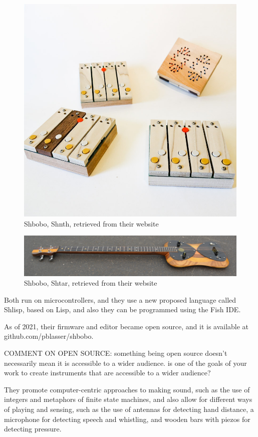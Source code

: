\begin{figure}[h]
  \centering
  \includegraphics[width=0.75\linewidth,height=0.25\textheight,keepaspectratio]{images/shbobo-shnth.jpg}
  \caption{Shbobo, Shnth, retrieved from their website}
  \label{fig:shbobo-shnth}
\end{figure}

\begin{figure}[h]
  \centering
    \includegraphics[width=0.75\linewidth,height=0.25\textheight,keepaspectratio]{images/shbobo-shtar.jpg}
  \caption{Shbobo, Shtar, retrieved from their website}
  \label{fig:shbobo-shtar}
\end{figure}

Both run on microcontrollers, and they use a new proposed language called Shlisp, based on Lisp, and also they can be programmed using the Fish IDE.

As of 2021, their firmware and editor became open source, and it is available at github.com/pblasser/shbobo.

COMMENT ON OPEN SOURCE: something being open source doesn't necessarily mean it is accessible to a wider audience. is one of the goals of your work to create instruments that are accessible to a wider audience?

They promote computer-centric approaches to making sound, such as the use of integers and metaphors of finite state machines, and also allow for different ways of playing and sensing, such as the use of antennas for detecting hand distance, a microphone for detecting speech and whistling, and wooden bars with piezos for detecting pressure.

